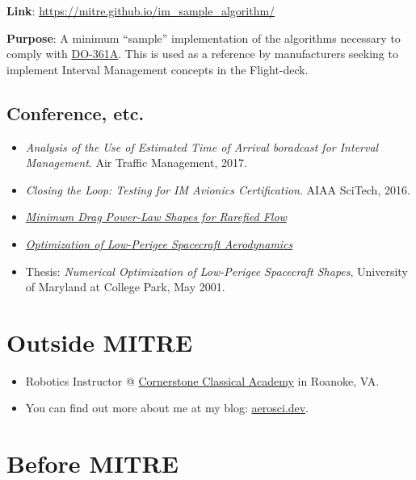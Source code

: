 \documentclass[
  letterpaper,
  DIV=11,
  numbers=noendperiod]{scrartcl}
\providecommand{\tightlist}{%
  \setlength{\itemsep}{0pt}\setlength{\parskip}{0pt}}\usepackage{longtable,booktabs,array}
\begin{document}
\textbf{Link}: \url{https://mitre.github.io/im_sample_algorithm/}

\textbf{Purpose}: A minimum ``sample'' implementation of the algorithms
necessary to comply with
\href{https://my.rtca.org/NC__Product?id=a1B1R00000BdQlmUAF}{DO-361A}.
This is used as a reference by manufacturers seeking to implement
Interval Management concepts in the Flight-deck.

\subsection{Conference, etc.}\label{conference-etc.}

\begin{itemize}
\tightlist
\item
  \emph{Analysis of the Use of Estimated Time of Arrival boradcast for
  Interval Management}. Air Traffic Management, 2017.
\item
  \emph{Closing the Loop: Testing for IM Avionics Certification}. AIAA
  SciTech, 2016.
\item
  \href{https://arc.aiaa.org/doi/abs/10.2514/2.1743}{\emph{Minimum Drag
  Power-Law Shapes for Rarefied Flow}}
\item
  \href{https://arc.aiaa.org/doi/abs/10.2514/2.3915}{\emph{Optimization
  of Low-Perigee Spacecraft Aerodynamics}}
\item
  Thesis: \emph{Numerical Optimization of Low-Perigee Spacecraft
  Shapes}, University of Maryland at College Park, May 2001.
\end{itemize}

\section{Outside MITRE}\label{outside-mitre}

\begin{itemize}
\tightlist
\item
  Robotics Instructor @
  \href{https://cornerstoneclassicalroanoke.org/faculty}{Cornerstone
  Classical Academy} in Roanoke, VA.
\item
  You can find out more about me at my blog:
  \href{https://www.aerosci.dev}{aerosci.dev}.
\end{itemize}

\section{Before MITRE}\label{before-mitre}
\end{document}
